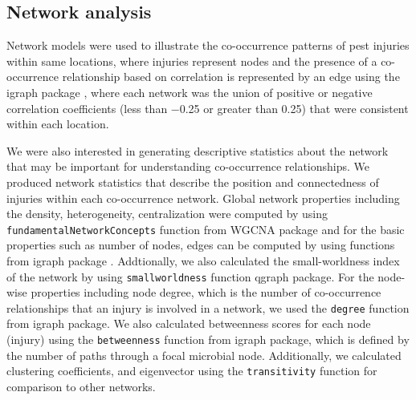 \subsection*{Network analysis}

Network models were used to illustrate the co-occurrence patterns of pest injuries within same locations, where injuries represent nodes and the presence of a co-occurrence relationship based on correlation is represented by an edge using the igraph package \cite{igraph_2006}, where each network was the union of positive or negative correlation coefficients (less than −0.25 or greater than 0.25) that were consistent within each location. 

We were also interested in generating descriptive statistics about the network that may be important for understanding co-occurrence relationships. We produced network statistics that describe the position and connectedness of injuries within each co-occurrence network. Global network properties including the density, heterogeneity, centralization were computed by using \texttt{fundamentalNetworkConcepts} function from  WGCNA package \cite{Langfelder_2008} and for the basic properties such as number of nodes, edges can be computed by using functions from igraph package . Addtionally, we also calculated the small-worldness index of the network by using \texttt{smallworldness} function qgraph package. For the node-wise properties including node degree, which is the number of co-occurrence relationships that an injury is involved in a network, we used the \texttt{degree} function from igraph package. We also calculated betweenness scores for each node (injury) using the \texttt{betweenness} function from igraph package, which is defined by the number of paths through a focal microbial node. Additionally, we calculated clustering coefficients, and eigenvector using the \texttt{transitivity} function for comparison to other networks.

